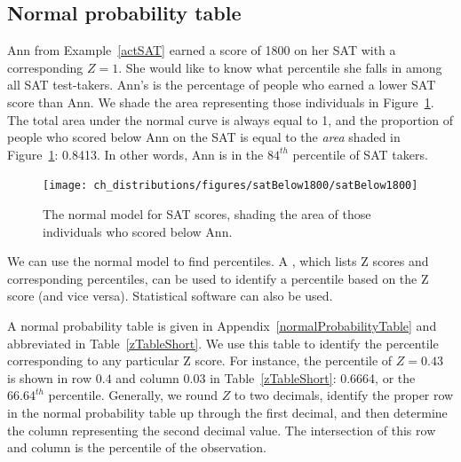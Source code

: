
\subsection{Normal probability table}

\begin{example}{Ann from Example~\ref{actSAT} earned a score of 1800 on her SAT with a corresponding $Z=1$. She would like to know what percentile she falls in among all SAT test-takers.}
Ann's  is the percentage of people who earned a lower SAT score than Ann. We shade the area representing those individuals in Figure~\ref{satBelow1800}. The total area under the normal curve is always equal to 1, and the proportion of people who scored below Ann on the SAT is equal to the \emph{area} shaded in Figure~\ref{satBelow1800}: 0.8413. In other words, Ann is in the $84^{th}$ percentile of SAT takers.
\end{example}

\begin{figure}[htb]
   \centering
   \texttt{[image: ch\_distributions/figures/satBelow1800/satBelow1800]}
   \caption{The normal model for SAT scores, shading the area of those individuals who scored below Ann.}
   \label{satBelow1800}
\end{figure}

We can use the normal model to find percentiles. A , which lists Z scores and corresponding percentiles, can be used to identify a percentile based on the Z score (and vice versa). Statistical software can also be used.

A normal probability table is given in Appendix~\vref{normalProbabilityTable} and abbreviated in Table~\ref{zTableShort}. We use this table to identify the percentile corresponding to any particular Z score. For instance, the percentile of $Z=0.43$ is shown in row $0.4$ and column $0.03$ in Table~\ref{zTableShort}: 0.6664, or the $66.64^{th}$ percentile. Generally, we round $Z$ to two decimals, identify the proper row in the normal probability table up through the first decimal, and then determine the column representing the second decimal value. The intersection of this row and column is the percentile of the observation.


